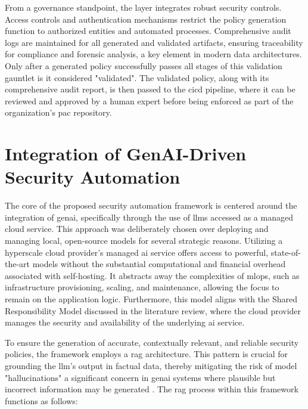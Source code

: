 From a governance standpoint, the layer integrates robust security controls. Access controls and authentication mechanisms restrict the policy generation function to authorized entities and automated processes. Comprehensive audit logs are maintained for all generated and validated artifacts, ensuring traceability for compliance and forensic analysis, a key element in modern data architectures\cite{noauthor_testbed_2025}. Only after a generated policy successfully passes all stages of this validation gauntlet is it considered "validated". The validated policy, along with its comprehensive audit report, is then passed to the \gls{cicd} pipeline, where it can be reviewed and approved by a human expert before being enforced as part of the organization's \gls{pac} repository.

\section{Integration of GenAI-Driven Security Automation} %
\label{sub:Integration of GenAI-Driven Security Automation}

The core of the proposed security automation framework is centered around the integration of \gls{genai}, specifically through the use of \glspl{llm} accessed as a managed cloud service. This approach was deliberately chosen over deploying and managing local, open-source models for several strategic reasons. Utilizing a hyperscale cloud provider's managed \gls{ai} service offers access to powerful, state-of-the-art models without the substantial computational and financial overhead associated with self-hosting. It abstracts away the complexities of \gls{mlops}, such as infrastructure provisioning, scaling, and maintenance, allowing the focus to remain on the application logic. Furthermore, this model aligns with the Shared Responsibility Model discussed in the literature review, where the cloud provider manages the security and availability of the underlying \gls{ai} service.

To ensure the generation of accurate, contextually relevant, and reliable security policies, the framework employs a \gls{rag} architecture. This pattern is crucial for grounding the \gls{llm}'s output in factual data, thereby mitigating the risk of model "hallucinations" a significant concern in \gls{genai} systems where plausible but incorrect information may be generated \cite{noauthor_ground_nodate}. The \gls{rag} process within this framework functions as follows:


